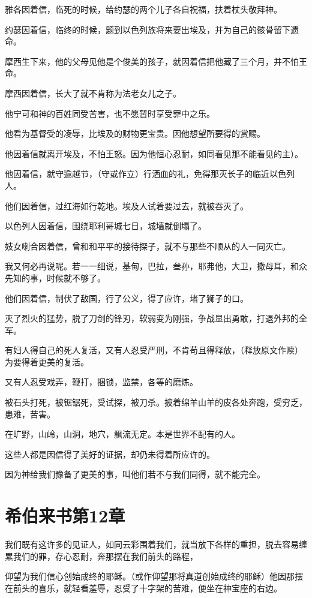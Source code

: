 \documentclass[12pt,oneside]{book}
\begin{document}
雅各因着信，临死的时候，给约瑟的两个儿子各自祝福，扶着杖头敬拜神。

约瑟因着信，临终的时候，题到以色列族将来要出埃及，并为自己的骸骨留下遗命。

摩西生下来，他的父母见他是个俊美的孩子，就因着信把他藏了三个月，并不怕王命。

摩西因着信，长大了就不肯称为法老女儿之子。

他宁可和神的百姓同受苦害，也不愿暂时享受罪中之乐。

他看为基督受的凌辱，比埃及的财物更宝贵。因他想望所要得的赏赐。

他因着信就离开埃及，不怕王怒。因为他恒心忍耐，如同看见那不能看见的主）。

他因着信，就守逾越节，（守或作立）行洒血的礼，免得那灭长子的临近以色列人。

他们因着信，过红海如行乾地。埃及人试着要过去，就被吞灭了。

以色列人因着信，围绕耶利哥城七日，城墙就倒塌了。

妓女喇合因着信，曾和和平平的接待探子，就不与那些不顺从的人一同灭亡。

我又何必再说呢。若一一细说，基甸，巴拉，叁孙，耶弗他，大卫，撒母耳，和众先知的事，时候就不够了。

他们因着信，制伏了敌国，行了公义，得了应许，堵了狮子的口。

灭了烈火的猛势，脱了刀剑的锋刃，软弱变为刚强，争战显出勇敢，打退外邦的全军。

有妇人得自己的死人复活，又有人忍受严刑，不肯苟且得释放，（释放原文作赎）为要得着更美的复活。

又有人忍受戏弄，鞭打，捆锁，监禁，各等的磨炼。

被石头打死，被锯锯死，受试探，被刀杀。披着绵羊山羊的皮各处奔跑，受穷乏，患难，苦害。

在旷野，山岭，山洞，地穴，飘流无定。本是世界不配有的人。

这些人都是因信得了美好的证据，却仍未得着所应许的。

因为神给我们豫备了更美的事，叫他们若不与我们同得，就不能完全。

\chapter{希伯来书第12章}
我们既有这许多的见证人，如同云彩围着我们，就当放下各样的重担，脱去容易缠累我们的罪，存心忍耐，奔那摆在我们前头的路程，

仰望为我们信心创始成终的耶稣。（或作仰望那将真道创始成终的耶稣）他因那摆在前头的喜乐，就轻看羞辱，忍受了十字架的苦难，便坐在神宝座的右边。
\end{document}

